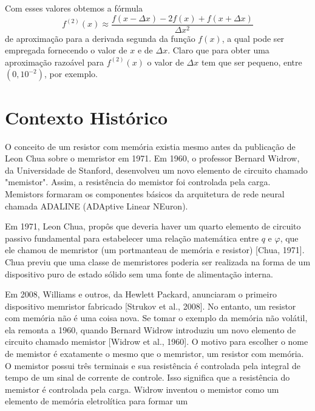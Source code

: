 \documentclass[10pt]{article}
\begin{document}
Com esses valores obtemos a fórmula 
\begin{equation}
f^{(2)}(x)\approx \dfrac{f(x-\Delta x)-2f(x)+f(x+\Delta x)}{\Delta x^2}
\end{equation}
de aproximação para a derivada segunda da função $f(x)$, a qual pode ser 
empregada fornecendo o valor de $x$ e de $\Delta x$. Claro que para obter 
uma aproximação razoável para $f^{(2)}(x)$ o valor de $\Delta x$ tem que 
ser pequeno, entre $(0,10^{-2})$, por exemplo. 

\section{Contexto Histórico}
O conceito de um resistor com memória existia mesmo antes da publicação de Leon Chua sobre o memristor em 1971. Em 1960, o professor Bernard Widrow, da Universidade de Stanford, desenvolveu um novo elemento de circuito chamado "memistor". Assim, a resistência do memistor foi controlada pela carga. Memistors formaram os componentes básicos da arquitetura de rede neural chamada ADALINE (ADAptive Linear NEuron).

Em 1971, Leon Chua, propôs que deveria haver um quarto elemento de circuito passivo fundamental para estabelecer uma relação matemática entre $q$ e $\varphi$, que ele chamou de memristor (um portmanteau de memória e resistor) [Chua, 1971]. Chua previu que uma classe de memristores poderia ser realizada na forma de um dispositivo puro de estado sólido sem uma fonte de alimentação interna.

Em 2008, Williams e outros, da Hewlett Packard, anunciaram o primeiro dispositivo memristor fabricado [Strukov et al., 2008]. No entanto, um resistor com memória não é uma coisa nova. Se tomar o exemplo da memória não volátil, ela remonta a 1960, quando Bernard Widrow introduziu um novo elemento de circuito chamado memistor [Widrow et al., 1960]. O motivo para escolher o nome de memistor é exatamente o mesmo que o memristor, um resistor com memória. O memistor possui três terminais e sua resistência é controlada pela integral de tempo de um sinal de corrente de controle. Isso significa que a resistência do memistor é controlada pela carga. Widrow inventou o memistor como um elemento de memória eletrolítica para formar um
\end{document}
